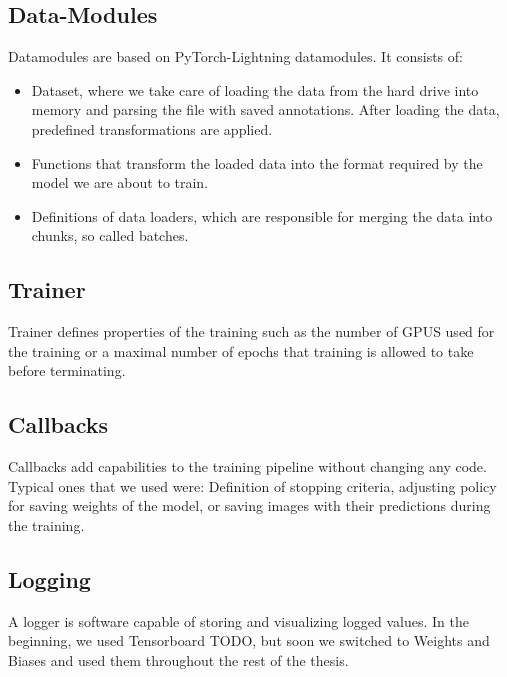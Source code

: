 \subsection{Data-Modules}
Datamodules are based on PyTorch-Lightning datamodules. It consists of:
\begin{itemize}
    \item Dataset, where we take care of loading the data from the hard drive into memory and parsing the file with saved annotations. After loading the data, predefined transformations are applied.
    \item Functions that transform the loaded data into the format required by the model we are about to train.
    \item Definitions of data loaders, which are responsible for merging the data into chunks, so called batches.
\end{itemize}
\subsection{Trainer}
Trainer defines properties of the training such as the number of GPUS used for the training or a maximal number of epochs that training is allowed to take before terminating.

\subsection{Callbacks}
Callbacks add capabilities to the training pipeline without changing any code. Typical ones that we used were: Definition of stopping criteria, adjusting policy for saving weights of the model, or saving images with their predictions during the training.

\subsection{Logging}
A logger is software capable of storing and visualizing logged values. In the beginning, we used Tensorboard TODO, but soon we switched to Weights and Biases \cite{wandb} and used them throughout the rest of the thesis.

